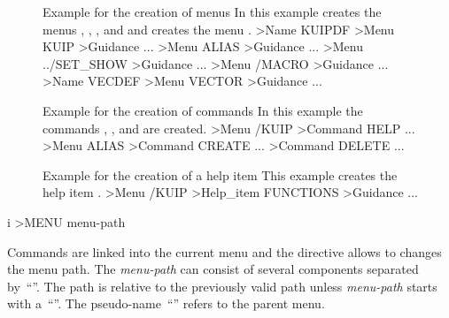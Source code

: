 \begin{figure}[p]
\begin{XMPtext}{Example for the creation of menus}{
In this example  creates the menus ,
, , and  and 
 creates the menu .
}
>Name KUIPDF
>Menu KUIP
>Guidance
      ...
>Menu ALIAS
>Guidance
      ...
>Menu ../SET_SHOW
>Guidance
      ...
>Menu /MACRO
>Guidance
      ...
>Name VECDEF
>Menu VECTOR
>Guidance
      ...
\end{XMPtext}
\vspace{-2\baselineskip}
\begin{XMPtext}{Example for the creation of commands}{
In this example the commands ,
, and  are created.
}
>Menu /KUIP
>Command HELP
      ...
>Menu ALIAS
>Command CREATE
      ...
>Command DELETE
      ...
\end{XMPtext}
\vspace{-2\baselineskip}
\begin{XMPtext}{Example for the creation of a help item}{
This example creates the help item .
}
>Menu /KUIP
>Help_item FUNCTIONS
>Guidance
      ...
\end{XMPtext}
\end{figure}

\begin{figure}[p]
\end{figure}

\begin{figure}[p]
\end{figure}

\begin{figure}[p]
\end{figure}


\begin{Gray}{i}
>MENU  menu-path
\end{Gray}
Commands are linked into the current menu and the 
directive allows to changes the menu path. 
The \textsl{menu-path} can consist of several components separated
by~``\Lit{/}''. 
The path is relative to the previously valid path unless \textsl{menu-path} starts with a~``\Lit{/}''.
The pseudo-name~``'' refers to the parent menu.


